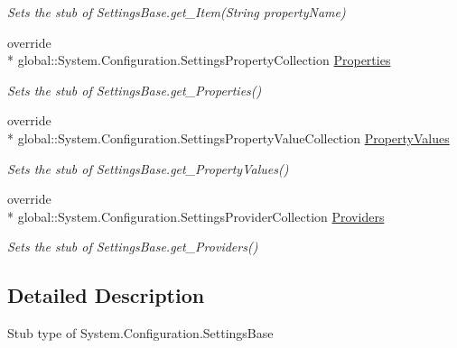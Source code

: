 \begin{DoxyCompactItemize}
\begin{DoxyCompactList}\small\item\em Sets the stub of Settings\-Base.\-get\-\_\-\-Item(\-String property\-Name)\end{DoxyCompactList}\item 
override \\*
global\-::\-System.\-Configuration.\-Settings\-Property\-Collection \hyperlink{class_system_1_1_configuration_1_1_fakes_1_1_stub_settings_base_ad17eda40cee4d807d34d4f42a8cdc297}{Properties}
\begin{DoxyCompactList}\small\item\em Sets the stub of Settings\-Base.\-get\-\_\-\-Properties()\end{DoxyCompactList}\item 
override \\*
global\-::\-System.\-Configuration.\-Settings\-Property\-Value\-Collection \hyperlink{class_system_1_1_configuration_1_1_fakes_1_1_stub_settings_base_a02ce9737d17176dabc82cd00649b77ea}{Property\-Values}
\begin{DoxyCompactList}\small\item\em Sets the stub of Settings\-Base.\-get\-\_\-\-Property\-Values()\end{DoxyCompactList}\item 
override \\*
global\-::\-System.\-Configuration.\-Settings\-Provider\-Collection \hyperlink{class_system_1_1_configuration_1_1_fakes_1_1_stub_settings_base_a1dc1e0eabb1f0eec1b530d8dfb0e57d2}{Providers}
\begin{DoxyCompactList}\small\item\em Sets the stub of Settings\-Base.\-get\-\_\-\-Providers()\end{DoxyCompactList}\end{DoxyCompactItemize}


\subsection{Detailed Description}
Stub type of System.\-Configuration.\-Settings\-Base



